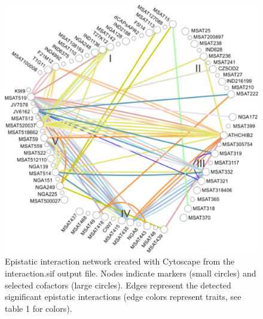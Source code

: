\begin{figure}[h!]
  \centering
  \includegraphics[keepaspectratio,scale=0.30]{eps/image_3_1_6.eps}
  \caption[Epistatic interaction network.]{Epistatic interaction network created with Cytoscape from the 
          interaction.sif output file. Nodes indicate markers (small circles) and selected cofactors (large 
          circles). Edges represent the detected significant epistatic interactions (edge colors represent 
          traits, see table 1 for colors).}
          \label{fig:epistaticinteractions}
\end{figure}

